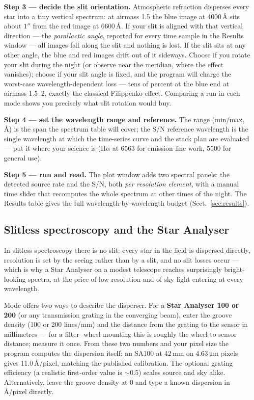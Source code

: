 \textbf{Step 3 — decide the slit orientation.} Atmospheric refraction
disperses every star into a tiny vertical spectrum: at airmass 1.5 the
blue image at 4000\,\AA{} sits about $1''$ from the red image at
6600\,\AA{}. If your slit is aligned with that vertical direction ---
the \emph{parallactic angle}, reported for every time sample in the
Results window --- all images fall along the slit and nothing is lost.
If the slit sits at any other angle, the blue and red images drift out
of it sideways. Choose  if you rotate your slit during
the night (or observe near the meridian, where the effect vanishes);
choose  if your slit angle is fixed, and the program will
charge the worst-case wavelength-dependent loss --- tens of percent at
the blue end at airmass 1.5--2, exactly the classical Filippenko effect.
Comparing a run in each mode shows you precisely what slit rotation
would buy.

\textbf{Step 4 — set the wavelength range and reference.} The range
(min/max, \AA{}) is the span the spectrum table will cover; the
\textsf{S/N reference wavelength} is the single wavelength at which the
time-series curve and the stack plan are evaluated --- put it where your
science is (H$\alpha$ at 6563 for emission-line work, 5500 for general
use).

\textbf{Step 5 — run and read.} The plot window adds two spectral
panels: the detected source rate and the S/N, both \emph{per resolution
element}, with a manual time slider that recomputes the whole spectrum
at other times of the night. The Results table gives the full
wavelength-by-wavelength budget (Sect.~\ref{sec:results}).

\subsection{Slitless spectroscopy and the Star Analyser}

In slitless spectroscopy there is no slit: every star in the field is
dispersed directly, resolution is set by the seeing rather than by a slit,
and no slit losses occur --- which is why a Star Analyser on a modest
telescope reaches surprisingly bright-looking spectra, at the price of
low resolution and of sky light entering at every wavelength.

Mode  offers two ways to describe the disperser. For a
\textbf{Star Analyser 100 or 200} (or any transmission grating in the
converging beam), enter the groove density (100 or 200 lines/mm) and the
distance from the grating to the sensor in millimetres --- for a filter-%
wheel mounting this is roughly the wheel-to-sensor distance; measure it
once. From these two numbers and your pixel size the program computes
the dispersion itself: an SA100 at 42\,mm on 4.63\,\si{\micro\metre}
pixels gives 11.0\,\AA/pixel, matching the published calibration. The
optional grating efficiency (a realistic first-order value is
$\sim$0.5) scales source and sky alike. Alternatively, leave the groove
density at 0 and type a known dispersion in \AA/pixel directly.

